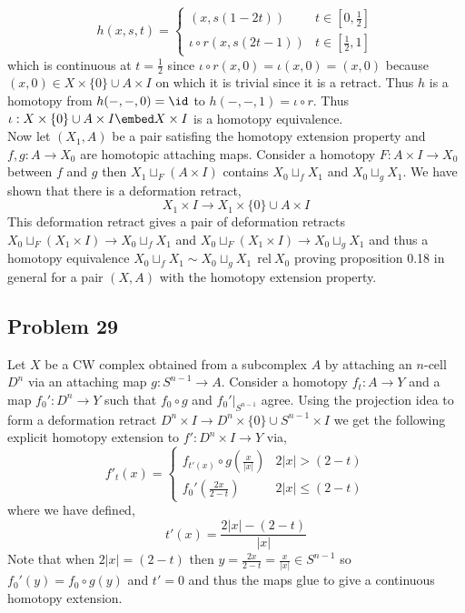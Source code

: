 \documentclass[12pt]{extarticle}
\begin{document}
\[ h(x, s, t) =  
\begin{cases}
(x, s (1 - 2t)) &  t \in [0, \tfrac{1}{2}] 
\\
\iota \circ r(x, s (2 t - 1)) & t \in [\tfrac{1}{2}, 1]
\end{cases} \] 
which is continuous at $t = \tfrac{1}{2}$ since $\iota \circ r(x, 0) = \iota(x, 0) = (x, 0)$ because $(x, 0) \in X \times \{ 0 \} \cup A \times I$ on which it is trivial since it is a retract. Thus $h$ is a homotopy from $h(-,-,0) = \id$ to $h(-,-,1) = \iota \circ r$. Thus $\iota : X \times \{ 0 \} \cup A \times I \embed X \times I$ is a homotopy equivalence. 
\bigskip\\
Now let $(X_1, A)$ be a pair satisfing the homotopy extension property and $f,g : A \to X_0$ are homotopic attaching maps. Consider a homotopy $F : A \times I \to X_0$ between $f$ and $g$ then $X_1 \sqcup_F (A \times I)$ contains $X_0 \sqcup_f X_1$ and $X_0 \sqcup_g X_1$. We have shown that there is a deformation retract,
\[ X_1 \times I \to X_1 \times \{ 0 \} \cup A \times I \]
This deformation retract gives a pair of deformation retracts $X_0 \sqcup_F (X_1 \times I) \to X_0 \sqcup_f X_1$ and $X_0 \sqcup_F (X_1 \times I) \to X_0 \sqcup_g X_1$ and thus a homotopy equivalence $X_0 \sqcup_f X_1 \sim X_0 \sqcup_g X_1 \: \: \mathrm{rel} \: X_0$ proving proposition 0.18 in general for a pair $(X, A)$ with the homotopy extension property. 

\subsection{Problem 29}

Let $X$ be a CW complex obtained from a subcomplex $A$ by attaching an $n$-cell $D^n$ via an attaching map $g : S^{n-1} \to A$. Consider a homotopy $f_t : A \to Y$ and a map $f_0' : D^n \to Y$ such that $f_0 \circ g$ and $f_0' |_{S^{n-1}}$ agree. Using the projection idea to form a deformation retract $D^n \times I \to D^n \times \{ 0 \} \cup S^{n-1} \times I$ we get the following explicit homotopy extension to $f' : D^n \times I \to Y$ via,
\[ f'_t(x) = 
\begin{cases}
f_{t'(x)} \circ g \left( \tfrac{x}{|x|} \right) & 2|x| > (2 - t)
\\
f_0' \left( \tfrac{2x}{2 - t} \right) & 2|x| \le (2 - t)
\end{cases} \]
where we have defined,
\[ t'(x) = \frac{2|x| - (2 - t)}{|x|} \]
Note that when $2 |x| = (2 - t)$ then $y = \frac{2 x}{2 - t} = \frac{x}{|x|} \in S^{n-1}$ so $f_0'(y) = f_0 \circ g(y)$ and $t' = 0$ and thus the maps glue to give a continuous homotopy extension. 
\end{document}
